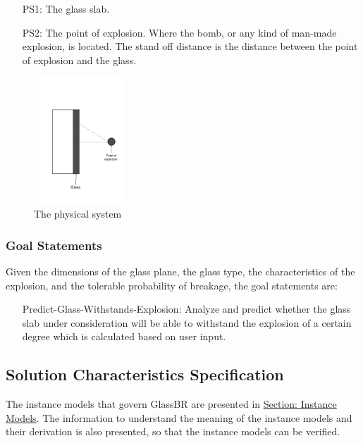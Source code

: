 \documentclass[12pt]{article}
\begin{document}
\begin{itemize}
\item[PS1:]The glass slab.
\item[PS2:]The point of explosion. Where the bomb, or any kind of man-made explosion, is located. The stand off distance is the distance between the point of explosion and the glass.
\end{itemize}
\begin{figure}
\begin{center}
\includegraphics[width=0.3\textwidth]{../../../datafiles/GlassBR/physicalsystimage.png}
\caption{The physical system}
\label{Figure:physSystImage}
\end{center}
\end{figure}
\subsubsection{Goal Statements}
\label{Sec:GoalStmt}
Given the dimensions of the glass plane, the glass type, the characteristics of the explosion, and the tolerable probability of breakage, the goal statements are:

\begin{itemize}
\item[Predict-Glass-Withstands-Explosion:\phantomsection\label{willBreakGS}]Analyze and predict whether the glass slab under consideration will be able to withstand the explosion of a certain degree which is calculated based on user input.
\end{itemize}
\subsection{Solution Characteristics Specification}
\label{Sec:SolCharSpec}
The instance models that govern GlassBR are presented in \hyperref[Sec:IMs]{Section: Instance Models}. The information to understand the meaning of the instance models and their derivation is also presented, so that the instance models can be verified.
\end{document}
